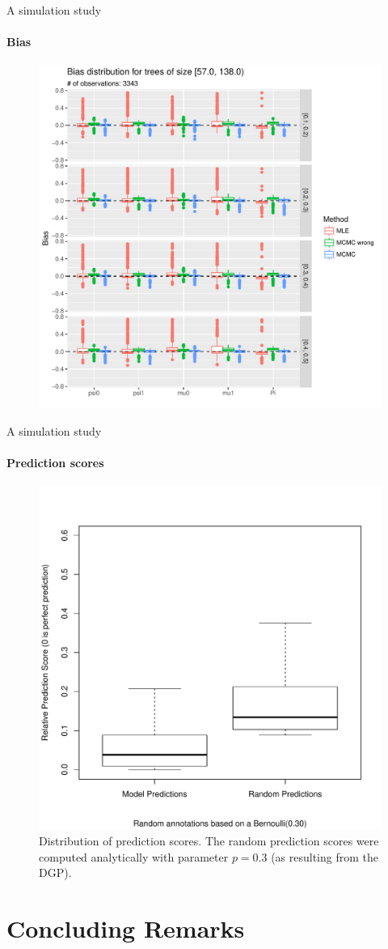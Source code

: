 \documentclass[9pt,ignorenonframetext,aspectratio=169]{beamer}
\begin{document}
\begin{frame}[t]{A simulation study}

\framesubtitle{Bias}

\begin{figure}
\centering
\includegraphics[width=.5\linewidth]{bias_trees_of_size_[57,138).pdf}
\end{figure}

\end{frame}

\begin{frame}[t]{A simulation study}

\framesubtitle{Prediction scores}

\begin{figure}
\centering
\caption{Distribution of prediction scores. The random prediction scores were computed analytically with parameter $p=0.3$ (as resulting from the DGP).}
\includegraphics[width=.45\linewidth, trim = {0 1cm 0 2cm}, clip]{mcmc_right_prior_prediction.pdf}
\end{figure}

\end{frame}

\section{Concluding Remarks}\label{concluding-remarks}
\end{document}
